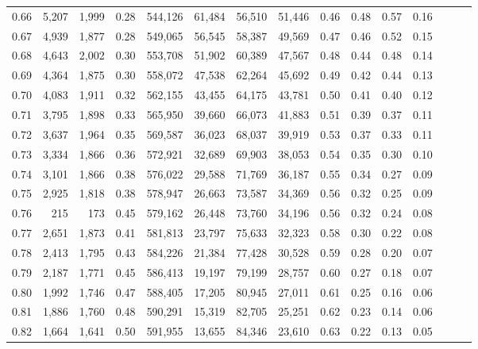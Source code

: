\begin{tabular}{rrrrrrrrrrrrrrr}
0.66 &   5,207 &  1,999 &  0.28 &  544,126 &   61,484 &   56,510 &   51,446 &  0.46 &  0.48 &  0.57 &      0.16 \\
0.67 &   4,939 &  1,877 &  0.28 &  549,065 &   56,545 &   58,387 &   49,569 &  0.47 &  0.46 &  0.52 &      0.15 \\
0.68 &   4,643 &  2,002 &  0.30 &  553,708 &   51,902 &   60,389 &   47,567 &  0.48 &  0.44 &  0.48 &      0.14 \\
0.69 &   4,364 &  1,875 &  0.30 &  558,072 &   47,538 &   62,264 &   45,692 &  0.49 &  0.42 &  0.44 &      0.13 \\
0.70 &   4,083 &  1,911 &  0.32 &  562,155 &   43,455 &   64,175 &   43,781 &  0.50 &  0.41 &  0.40 &      0.12 \\
0.71 &   3,795 &  1,898 &  0.33 &  565,950 &   39,660 &   66,073 &   41,883 &  0.51 &  0.39 &  0.37 &      0.11 \\
0.72 &   3,637 &  1,964 &  0.35 &  569,587 &   36,023 &   68,037 &   39,919 &  0.53 &  0.37 &  0.33 &      0.11 \\
0.73 &   3,334 &  1,866 &  0.36 &  572,921 &   32,689 &   69,903 &   38,053 &  0.54 &  0.35 &  0.30 &      0.10 \\
0.74 &   3,101 &  1,866 &  0.38 &  576,022 &   29,588 &   71,769 &   36,187 &  0.55 &  0.34 &  0.27 &      0.09 \\
0.75 &   2,925 &  1,818 &  0.38 &  578,947 &   26,663 &   73,587 &   34,369 &  0.56 &  0.32 &  0.25 &      0.09 \\
0.76 &     215 &    173 &  0.45 &  579,162 &   26,448 &   73,760 &   34,196 &  0.56 &  0.32 &  0.24 &      0.08 \\
0.77 &   2,651 &  1,873 &  0.41 &  581,813 &   23,797 &   75,633 &   32,323 &  0.58 &  0.30 &  0.22 &      0.08 \\
0.78 &   2,413 &  1,795 &  0.43 &  584,226 &   21,384 &   77,428 &   30,528 &  0.59 &  0.28 &  0.20 &      0.07 \\
0.79 &   2,187 &  1,771 &  0.45 &  586,413 &   19,197 &   79,199 &   28,757 &  0.60 &  0.27 &  0.18 &      0.07 \\
0.80 &   1,992 &  1,746 &  0.47 &  588,405 &   17,205 &   80,945 &   27,011 &  0.61 &  0.25 &  0.16 &      0.06 \\
0.81 &   1,886 &  1,760 &  0.48 &  590,291 &   15,319 &   82,705 &   25,251 &  0.62 &  0.23 &  0.14 &      0.06 \\
0.82 &   1,664 &  1,641 &  0.50 &  591,955 &   13,655 &   84,346 &   23,610 &  0.63 &  0.22 &  0.13 &      0.05 \\

\end{tabular}
